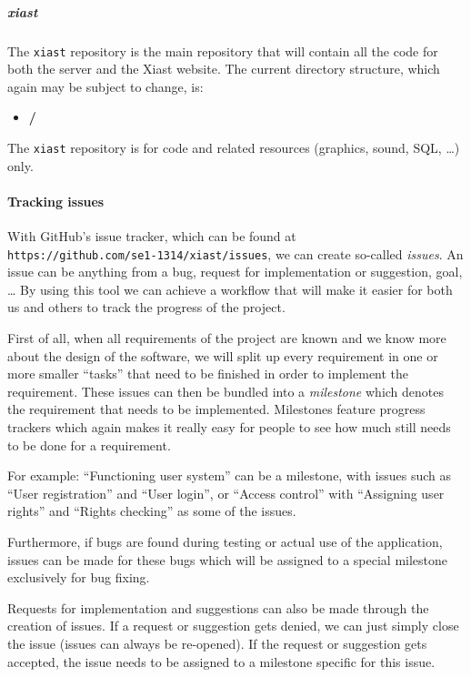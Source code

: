 \documentclass[9pt]{article}
\begin{document}
\subparagraph{xiast}\label{xiast}

The \texttt{xiast} repository is the main repository that will contain
all the code for both the server and the Xiast website. The current
directory structure, which again may be subject to change, is:

\begin{itemize}
\itemsep1pt\parskip0pt
\item
  \textbf{/}
\end{itemize}

The \texttt{xiast} repository is for code and related resources
(graphics, sound, SQL, \ldots{}) only.

\paragraph{Tracking issues}\label{tracking-issues}

With GitHub's issue tracker, which can be found at\\
\texttt{https://github.com/se1-1314/xiast/issues}, we can create
so-called \emph{issues}. An issue can be anything from a bug, request
for implementation or suggestion, goal, \ldots{} By using this tool we
can achieve a workflow that will make it easier for both us and others
to track the progress of the project.

First of all, when all requirements of the project are known and we know
more about the design of the software, we will split up every
requirement in one or more smaller ``tasks'' that need to be finished in
order to implement the requirement. These issues can then be bundled
into a \emph{milestone} which denotes the requirement that needs to be
implemented. Milestones feature progress trackers which again makes it
really easy for people to see how much still needs to be done for a
requirement.

For example: ``Functioning user system'' can be a milestone, with issues
such as ``User registration'' and ``User login'', or ``Access control''
with ``Assigning user rights'' and ``Rights checking'' as some of the
issues.

Furthermore, if bugs are found during testing or actual use of the
application, issues can be made for these bugs which will be assigned to
a special milestone exclusively for bug fixing.

Requests for implementation and suggestions can also be made through the
creation of issues. If a request or suggestion gets denied, we can just
simply close the issue (issues can always be re-opened). If the request
or suggestion gets accepted, the issue needs to be assigned to a
milestone specific for this issue.
\end{document}

